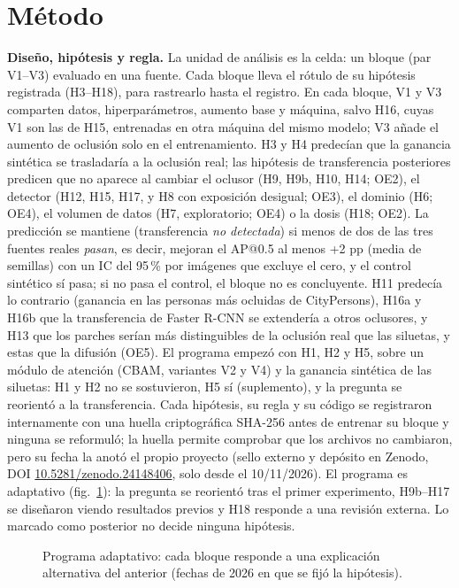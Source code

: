 \documentclass[conference]{IEEEtran}
\begin{document}
\section{Método}
\textbf{Diseño, hipótesis y regla.} La unidad de análisis es la celda: un bloque (par V1--V3) evaluado en una fuente. Cada bloque lleva el rótulo de su hipótesis registrada (H3--H18), para rastrearlo hasta el registro. En cada bloque, V1 y V3 comparten datos, hiperparámetros, aumento base y máquina, salvo H16, cuyas V1 son las de H15, entrenadas en otra máquina del mismo modelo; V3 añade el aumento de oclusión solo en el entrenamiento. H3 y H4 predecían que la ganancia sintética se trasladaría a la oclusión real; las hipótesis de transferencia posteriores predicen que no aparece al cambiar el oclusor (H9, H9b, H10, H14; OE2), el detector (H12, H15, H17, y H8 con exposición desigual; OE3), el dominio (H6; OE4), el volumen de datos (H7, exploratorio; OE4) o la dosis (H18; OE2). La predicción se mantiene (transferencia \emph{no detectada}) si menos de dos de las tres fuentes reales \emph{pasan}, es decir, mejoran el AP@0.5 al menos +2 pp (media de semillas) con un IC del 95\,\% por imágenes que excluye el cero, y el control sintético sí pasa; si no pasa el control, el bloque no es concluyente. H11 predecía lo contrario (ganancia en las personas más ocluidas de CityPersons), H16a y H16b que la transferencia de Faster R-CNN se extendería a otros oclusores, y H13 que los parches serían más distinguibles de la oclusión real que las siluetas, y estas que la difusión (OE5). El programa empezó con H1, H2 y H5, sobre un módulo de atención (CBAM, variantes V2 y V4) y la ganancia sintética de las siluetas: H1 y H2 no se sostuvieron, H5 sí (suplemento), y la pregunta se reorientó a la transferencia. Cada hipótesis, su regla y su código se registraron internamente con una huella criptográfica SHA-256 antes de entrenar su bloque y ninguna se reformuló; la huella permite comprobar que los archivos no cambiaron, pero su fecha la anotó el propio proyecto (sello externo y depósito en Zenodo, DOI \href{https://doi.org/10.5281/zenodo.24148406}{\mbox{10.5281/zenodo.24148406}}, solo desde el 10/11/2026). El programa es adaptativo (fig.~\ref{fig:prog}): la pregunta se reorientó tras el primer experimento, H9b--H17 se diseñaron viendo resultados previos y H18 responde a una revisión externa. Lo marcado como posterior no decide ninguna hipótesis.

\begin{figure}[t]
\centering

\caption{Programa adaptativo: cada bloque responde a una explicación alternativa del anterior (fechas de 2026 en que se fijó la hipótesis).}
\label{fig:prog}
\end{figure}
\end{document}
